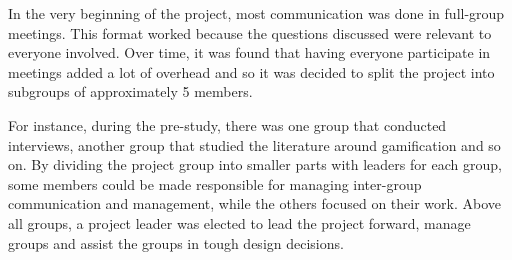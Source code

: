 In the very beginning of the project, most communication was done in full-group meetings. This format worked because the questions discussed were relevant to everyone involved. Over time, it was found that having everyone participate in meetings added a lot of overhead and so it was decided to split the project into subgroups of approximately 5 members.

For instance, during the pre-study, there was one group that conducted interviews, another group that studied the literature around gamification and so on. By dividing the project group into smaller parts with leaders for each group, some members could be made responsible for managing inter-group communication and management, while the others focused on their work. Above all groups, a project leader was elected to lead the project forward, manage groups and assist the groups in tough design decisions. %

